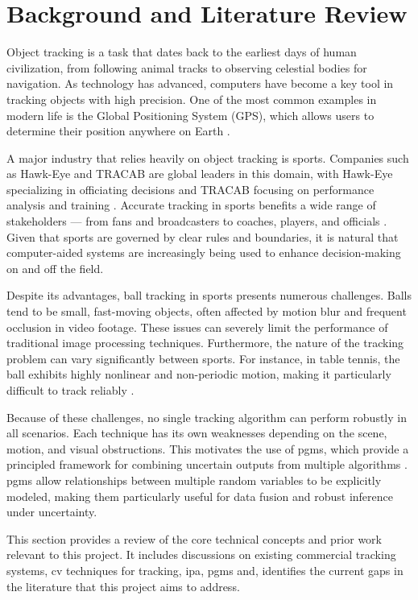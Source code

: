 \documentclass[12pt,a4paper]{article}
\begin{document}
\newpage
\section{Background and Literature Review}
Object tracking is a task that dates back to the earliest days of human civilization, from following animal tracks to observing celestial bodies for navigation. As technology has advanced, computers have become a key tool in tracking objects with high precision. One of the most common examples in modern life is the Global Positioning System (GPS), which allows users to determine their position anywhere on Earth \parencite{challa2011fundamentals}.

A major industry that relies heavily on object tracking is sports. Companies such as Hawk-Eye and TRACAB are global leaders in this domain, with Hawk-Eye specializing in officiating decisions and TRACAB focusing on performance analysis and training \parencite{tracab2024,hawkeye2024}. Accurate tracking in sports benefits a wide range of stakeholders — from fans and broadcasters to coaches, players, and officials \parencite{labayen2014accurate}. Given that sports are governed by clear rules and boundaries, it is natural that computer-aided systems are increasingly being used to enhance decision-making on and off the field.

Despite its advantages, ball tracking in sports presents numerous challenges. Balls tend to be small, fast-moving objects, often affected by motion blur and frequent occlusion in video footage. These issues can severely limit the performance of traditional image processing techniques. Furthermore, the nature of the tracking problem can vary significantly between sports. For instance, in table tennis, the ball exhibits highly nonlinear and non-periodic motion, making it particularly difficult to track reliably \parencite{kamble2019ball}.

Because of these challenges, no single tracking algorithm can perform robustly in all scenarios. Each technique has its own weaknesses depending on the scene, motion, and visual obstructions. This motivates the use of \acl{pgm}s, which provide a principled framework for combining uncertain outputs from multiple algorithms \parencite{koller2009pgm}. \acs{pgm}s allow relationships between multiple random variables to be explicitly modeled, making them particularly useful for data fusion and robust inference under uncertainty.

This section provides a review of the core technical concepts and prior work relevant to this project. It includes discussions on existing commercial tracking systems, \acl{cv} techniques for tracking, \acs{ipa}, \acs{pgm}s and, identifies the current gaps in the literature that this project aims to address.
\end{document}
